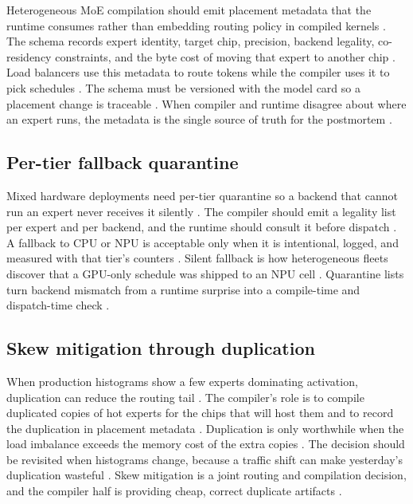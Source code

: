 Heterogeneous MoE compilation should emit placement metadata that the runtime consumes rather than embedding routing policy in compiled kernels \citep{liu2024deepseekv3,patel2025llminference,chen2020compilerbasedhardw}. The schema records expert identity, target chip, precision, backend legality, co-residency constraints, and the byte cost of moving that expert to another chip \citep{amd2024xdna,yirage2026,memoryfloor2026}. Load balancers use this metadata to route tokens while the compiler uses it to pick schedules \citep{liu2024deepseekv3,patel2025llminference}. The schema must be versioned with the model card so a placement change is traceable \citep{chen2020compilerbasedhardw,taxbreak2026}. When compiler and runtime disagree about where an expert runs, the metadata is the single source of truth for the postmortem \citep{patel2025llminference,memoryfloor2026}.

\subsection{Per-tier fallback quarantine}

Mixed hardware deployments need per-tier quarantine so a backend that cannot run an expert never receives it silently \citep{amd2024xdna,amd2024aie,chen2020compilerbasedhardw}. The compiler should emit a legality list per expert and per backend, and the runtime should consult it before dispatch \citep{patel2025llminference,yirage2026,memoryfloor2026}. A fallback to CPU or NPU is acceptable only when it is intentional, logged, and measured with that tier's counters \citep{dlbook,amd2024aie,taxbreak2026}. Silent fallback is how heterogeneous fleets discover that a GPU-only schedule was shipped to an NPU cell \citep{amd2024xdna,patel2025llminference}. Quarantine lists turn backend mismatch from a runtime surprise into a compile-time and dispatch-time check \citep{chen2020compilerbasedhardw,memoryfloor2026}.

\subsection{Skew mitigation through duplication}

When production histograms show a few experts dominating activation, duplication can reduce the routing tail \citep{liu2024deepseekv3,patel2025llminference,taxbreak2026}. The compiler's role is to compile duplicated copies of hot experts for the chips that will host them and to record the duplication in placement metadata \citep{chen2020compilerbasedhardw,memoryfloor2026}. Duplication is only worthwhile when the load imbalance exceeds the memory cost of the extra copies \citep{patel2025llminference,memoryfloor2026}. The decision should be revisited when histograms change, because a traffic shift can make yesterday's duplication wasteful \citep{liu2024deepseekv3,chen2020compilerbasedhardw}. Skew mitigation is a joint routing and compilation decision, and the compiler half is providing cheap, correct duplicate artifacts \citep{patel2025llminference,taxbreak2026}.

